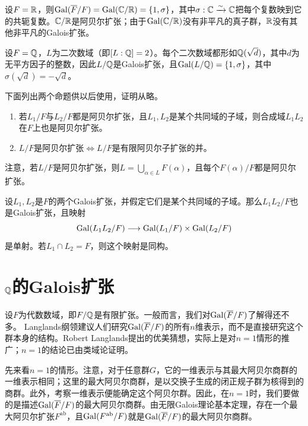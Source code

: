 \begin{example}\label{L1S1O1}
设$F=\mathbb{R}$，则$\operatorname{Gal}(\overline F/F)=\operatorname{Gal}(\mathbb{C}/\mathbb{R})=\{1,\sigma\}$，其中$\sigma:\mathbb{C}\xrightarrow{\sim}\mathbb{C}$把每个复数映到它的共轭复数。$\mathbb{C}/\mathbb{R}$是阿贝尔扩张；由于$\operatorname{Gal}(\mathbb{C}/\mathbb{R})$没有非平凡的真子群，$\mathbb{R}$没有其他非平凡的Galois扩张。
\end{example}
\begin{example}\label{L1S1O2}
设$F=\mathbb{Q}$，$L$为二次数域（即$[L:\mathbb{Q}]=2$）。每个二次数域都形如$\mathbb{Q}(\sqrt d)$，其中$d$为无平方因子的整数，因此$L/\mathbb{Q}$是Galois扩张，且$\operatorname{Gal}(L/\mathbb{Q})=\{1,\sigma\}$，其中$\sigma(\sqrt d)=-\sqrt d$。
\end{example}
下面列出两个命题供以后使用，证明从略。
\begin{proposition}\label{L1S1O3}
\begin{enumerate}
\item 若$L_1/F$与$L_2/F$都是阿贝尔扩张，且$L_1,L_2$是某个共同域的子域，则合成域$L_1L_2$在$F$上也是阿贝尔扩张。
\item $L/F$是阿贝尔扩张$\iff L/F$是有限阿贝尔子扩张的并。
\end{enumerate}
\end{proposition}
注意，若$L/F$是阿贝尔扩张，则$L=\bigcup_{\alpha\in L}F(\alpha)$，且每个$F(\alpha)/F$都是阿贝尔扩张。
\begin{proposition}\label{L1S1O4}
设$L_1,L_2$是$F$的两个Galois扩张，并假定它们是某个共同域的子域。那么$L_1L_2/F$也是Galois扩张，且映射
\[\operatorname{Gal}(L_1L_2/F)\longrightarrow\operatorname{Gal}(L_1/F)\times\operatorname{Gal}(L_2/F)\]
是单射。若$L_1\cap L_2=F$，则这个映射是同构。
\end{proposition}
\section{\texorpdfstring{$\mathbb{Q}$的Galois扩张}{Q的Galois扩张}}\label{L1S2}
设$F$为代数数域，即$F/\mathbb{Q}$是有限扩张。一般而言，我们对$\operatorname{Gal}(\overline F/F)$了解得还不多。
Langlands纲领建议人们研究$\operatorname{Gal}(\overline F/F)$的所有$n$维表示，而不是直接研究这个群本身的结构。Robert Langlands提出的优美猜想，实际上是对$n=1$情形的推广；$n=1$的结论已由类域论证明。

先来看$n=1$的情形。注意，对于任意群$G$，它的一维表示与其最大阿贝尔商群的一维表示相同；这里的最大阿贝尔商群，是以交换子生成的闭正规子群为核得到的商群。此外，考察一维表示便能确定这个阿贝尔群。因此，在$n=1$时，我们要做的是描述$\operatorname{Gal}(\overline F/F)$的最大阿贝尔商群。由无限Galois理论基本定理，存在一个最大阿贝尔扩张$F^{\mathrm{ab}}$，且$\operatorname{Gal}(F^{\mathrm{ab}}/F)$就是$\operatorname{Gal}(\overline F/F)$的最大阿贝尔商群。

